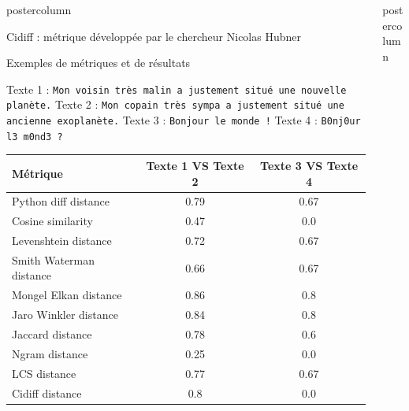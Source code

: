 \begin{frame}
\begin{columns}
\begin{column}{.49\textwidth}
\begin{beamercolorbox}[center,wd=\textwidth]{postercolumn}
\begin{minipage}[T]{.95\textwidth}
{\begin{block}{Cidiff : métrique développée par le chercheur Nicolas Hubner}
            \end{block}
            
            \vfill
            
            \begin{block}{Exemples de métriques et de résultats}

              Texte 1 : \texttt{Mon voisin très malin a justement situé une nouvelle planète.}
              \newline
              Texte 2 : \texttt{Mon copain très sympa a justement situé une ancienne exoplanète.}
              \newline
              Texte 3 : \texttt{Bonjour le monde !}
              \newline
              Texte 4 : \texttt{B0nj0ur l3 m0nd3 ?}
            
              \begin{tabular}{|l|c|c|}
                \hline
                \textbf{Métrique} & \textbf{Texte 1 VS Texte 2} & \textbf{Texte 3 VS Texte 4} \\
                \hline
                Python diff distance & 0.79 & 0.67 \\
                Cosine similarity & 0.47 & 0.0 \\
                Levenshtein distance & 0.72 & 0.67 \\
                Smith Waterman distance & 0.66 & 0.67 \\
                Mongel Elkan distance & 0.86 & 0.8 \\
                Jaro Winkler distance & 0.84 & 0.8 \\
                Jaccard distance & 0.78 & 0.6 \\
                Ngram distance & 0.25 & 0.0 \\
                LCS distance & 0.77 & 0.67 \\
                Cidiff distance & 0.8 & 0.0 \\
                \hline
              \end{tabular}
            
            \end{block}
            \vfill
            
          }
        \end{minipage}
      \end{beamercolorbox}
    \end{column}
    \begin{column}{.49\textwidth}
      \begin{beamercolorbox}[center,wd=\textwidth]{postercolumn}
        \begin{minipage}[T]{.95\textwidth}
          \parbox[t][\columnheight]{\textwidth}{
            
}
\end{minipage}
\end{beamercolorbox}
\end{column}
\end{columns}
\end{frame}
